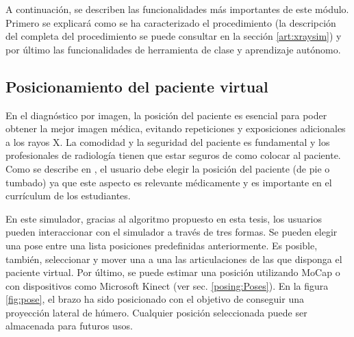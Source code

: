 A continuación, se describen las funcionalidades más importantes de este módulo. Primero se explicará como se ha caracterizado el procedimiento (la descripción del completa del procedimiento se puede consultar en la sección \ref{art:xraysim}) y por último las funcionalidades de herramienta de clase y aprendizaje autónomo.




\subsection{Posicionamiento del paciente virtual}
\label{xray:posing}

En el diagnóstico por imagen, la posición del paciente es esencial para poder obtener la mejor imagen médica, evitando repeticiones y exposiciones adicionales a los rayos X. La comodidad y la seguridad del paciente es fundamental y los profesionales de radiología tienen que estar seguros de como colocar al paciente. Como se describe en \cite{carver2012medical,manualpractico}, el usuario debe elegir la posición del paciente (de pie o tumbado) ya que este aspecto es relevante médicamente y es importante en el currículum de los estudiantes.

En este simulador, gracias al algoritmo propuesto en esta tesis, %
los usuarios pueden interaccionar con el simulador a través %
de tres formas. Se pueden elegir una pose entre una lista posiciones predefinidas anteriormente. Es posible, también, seleccionar y mover una a una las articulaciones de las que disponga el paciente virtual. Por último, se puede estimar una posición utilizando \ac{MoCap} o con dispositivos como Microsoft Kinect (ver sec. \ref{posing:Poses}). 
%
En la figura \ref{fig:pose}, el brazo ha sido posicionado con el objetivo de conseguir una proyección lateral de húmero. Cualquier posición seleccionada puede ser almacenada para futuros usos.



		
